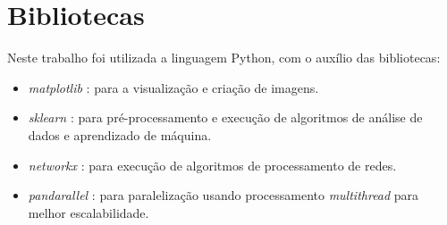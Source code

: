 \section{Bibliotecas}

Neste trabalho foi utilizada a linguagem Python, com o auxílio das bibliotecas:

\begin{itemize}
    \item \textit{matplotlib} \cite{matplotlib}: para a visualização e criação de imagens.
    \item \textit{sklearn} \cite{sklearn}: para pré-processamento e execução de algoritmos de análise de dados e aprendizado de máquina.
    \item \textit{networkx} \cite{networkx}: para execução de algoritmos de processamento de redes.
    \item \textit{pandarallel} \cite{pandarallel}: para paralelização usando processamento \textit{multithread} para melhor escalabilidade.
\end{itemize}
